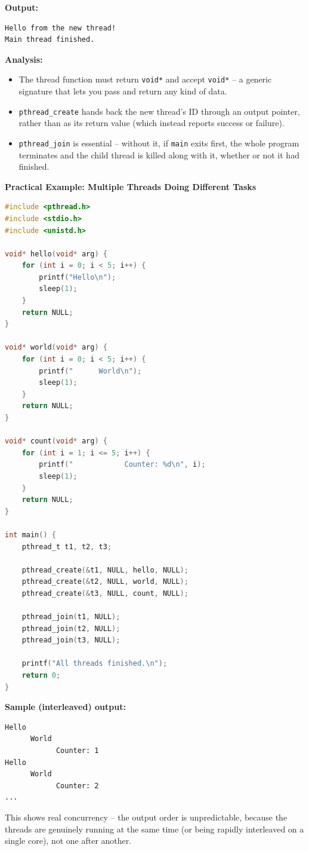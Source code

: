 \textbf{Output:} %
\begin{lstlisting}[language=Terminal]
Hello from the new thread!
Main thread finished.
\end{lstlisting} %

\textbf{Analysis:} %
\begin{itemize}
    \item The thread function must return \texttt{void*} and accept \texttt{void*} -- a generic signature that lets you pass and return any kind of data. %
    \item \texttt{pthread\_create} hands back the new thread's ID through an output pointer, rather than as its return value (which instead reports success or failure). %
    \item \texttt{pthread\_join} is essential -- without it, if \texttt{main} exits first, the whole program terminates and the child thread is killed along with it, whether or not it had finished. %
\end{itemize}

\textbf{Practical Example: Multiple Threads Doing Different Tasks} %
\begin{lstlisting}[language=C]
#include <pthread.h>
#include <stdio.h>
#include <unistd.h>

void* hello(void* arg) {
    for (int i = 0; i < 5; i++) {
        printf("Hello\n");
        sleep(1);
    }
    return NULL;
}

void* world(void* arg) {
    for (int i = 0; i < 5; i++) {
        printf("      World\n");
        sleep(1);
    }
    return NULL;
}

void* count(void* arg) {
    for (int i = 1; i <= 5; i++) {
        printf("            Counter: %d\n", i);
        sleep(1);
    }
    return NULL;
}

int main() {
    pthread_t t1, t2, t3;

    pthread_create(&t1, NULL, hello, NULL);
    pthread_create(&t2, NULL, world, NULL);
    pthread_create(&t3, NULL, count, NULL);

    pthread_join(t1, NULL);
    pthread_join(t2, NULL);
    pthread_join(t3, NULL);

    printf("All threads finished.\n");
    return 0;
}
\end{lstlisting} %

\textbf{Sample (interleaved) output:} %
\begin{lstlisting}[language=Terminal]
Hello
      World
            Counter: 1
Hello
      World
            Counter: 2
...
\end{lstlisting} %
This shows real concurrency -- the output order is unpredictable, because the threads are genuinely running at the same time (or being rapidly interleaved on a single core), not one after another. %

